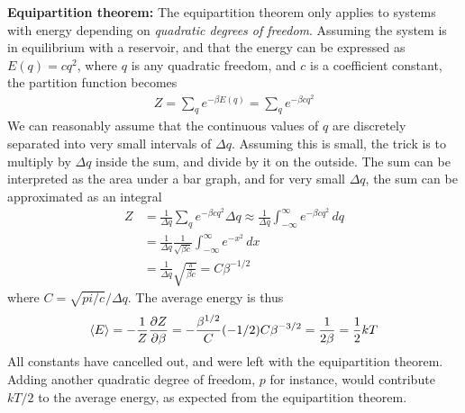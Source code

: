 \documentclass[a4paper, english, 12pt]{article}
\begin{document}
\begin{multicols*}{2}
\textbf{Equipartition theorem:} The equipartition theorem only applies to systems with energy depending on \textit{quadratic degrees of freedom}. Assuming the system is in equilibrium with a reservoir, and that the energy can be expressed as $E(q)=c q^2$, where $q$ is any quadratic freedom, and $c$ is a coefficient constant, the partition function becomes 
\begin{align*}
    Z=\sum_q e^{-\beta E(q)}=\sum_q e^{-\beta c q^2}
\end{align*}
We can reasonably assume that the continuous values of $q$ are discretely separated into very small intervals of $\Delta q$. Assuming this is small, the trick is to multiply by $\Delta q$ inside the sum, and divide by it on the outside. The sum can be interpreted as the area under a bar graph, and for very small $\Delta q$, the sum can be approximated as an integral 
\begin{align*}
    Z&=\frac{1}{\Delta q}\sum_q e^{-\beta c q^2}\Delta q \approx \frac{1}{\Delta q} \int_{-\infty}^\infty e^{-\beta cq^2}\,dq \\ 
    &=\frac{1}{\Delta q}\frac{1}{\sqrt{\beta c}}\int_{-\infty}^\infty e^{-x^2}\,dx \\ 
    &= \frac{1}{\Delta q}\sqrt{\frac{\pi}{\beta c}}=C\beta^{-1/2}
\end{align*}
where $C=\sqrt{pi/c}/\Delta q$. The average energy is thus 
\begin{align*}
    \expval{E}=-\frac{1}{Z}\pdv{Z}{\beta}=-\frac{\beta^{1/2}}{C}(-1/2)C\beta^{-3/2}=\frac{1}{2\beta} =\frac{1}{2}kT
\end{align*}
All constants have cancelled out, and were left with the equipartition theorem. Adding another quadratic degree of freedom, $p$ for instance, would contribute $kT/2$ to the average energy, as expected from the equipartition theorem. 



\end{multicols*}
\end{document}
